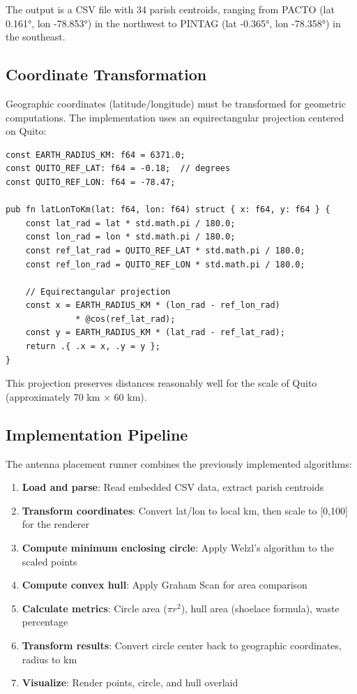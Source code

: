 \documentclass[11pt,a4paper]{article}
\begin{document}
The output is a CSV file with 34 parish centroids, ranging from PACTO (lat 0.161°, lon -78.853°) in the northwest to PINTAG (lat -0.365°, lon -78.358°) in the southeast.

\subsection{Coordinate Transformation}

Geographic coordinates (latitude/longitude) must be transformed for geometric computations. The implementation uses an equirectangular projection centered on Quito:

\begin{lstlisting}[caption={Geographic to local coordinate conversion}]
const EARTH_RADIUS_KM: f64 = 6371.0;
const QUITO_REF_LAT: f64 = -0.18;  // degrees
const QUITO_REF_LON: f64 = -78.47;

pub fn latLonToKm(lat: f64, lon: f64) struct { x: f64, y: f64 } {
    const lat_rad = lat * std.math.pi / 180.0;
    const lon_rad = lon * std.math.pi / 180.0;
    const ref_lat_rad = QUITO_REF_LAT * std.math.pi / 180.0;
    const ref_lon_rad = QUITO_REF_LON * std.math.pi / 180.0;

    // Equirectangular projection
    const x = EARTH_RADIUS_KM * (lon_rad - ref_lon_rad)
              * @cos(ref_lat_rad);
    const y = EARTH_RADIUS_KM * (lat_rad - ref_lat_rad);
    return .{ .x = x, .y = y };
}
\end{lstlisting}

This projection preserves distances reasonably well for the scale of Quito (approximately 70 km × 60 km).

\subsection{Implementation Pipeline}

The antenna placement runner combines the previously implemented algorithms:

\begin{enumerate}
    \item \textbf{Load and parse}: Read embedded CSV data, extract parish centroids
    \item \textbf{Transform coordinates}: Convert lat/lon to local km, then scale to [0,100] for the renderer
    \item \textbf{Compute minimum enclosing circle}: Apply Welzl's algorithm to the scaled points
    \item \textbf{Compute convex hull}: Apply Graham Scan for area comparison
    \item \textbf{Calculate metrics}: Circle area ($\pi r^2$), hull area (shoelace formula), waste percentage
    \item \textbf{Transform results}: Convert circle center back to geographic coordinates, radius to km
    \item \textbf{Visualize}: Render points, circle, and hull overlaid
\end{enumerate}
\end{document}
